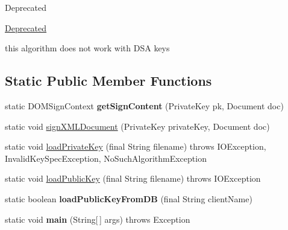 \begin{DoxyRefDesc}{Deprecated}
\item[\hyperlink{deprecated__deprecated000013}{Deprecated}]
\begin{DoxyItemize}
\item this algorithm does not work with D\-S\-A keys 
\end{DoxyItemize}\end{DoxyRefDesc}
\subsection*{Static Public Member Functions}
\begin{DoxyCompactItemize}
\item 
\hypertarget{classgov_1_1fnal_1_1ppd_1_1ZZattic_1_1GenEnveloped_a69be7eea0c284cf04dc66e76138895a8}{static D\-O\-M\-Sign\-Context {\bfseries get\-Sign\-Content} (Private\-Key pk, Document doc)}\label{classgov_1_1fnal_1_1ppd_1_1ZZattic_1_1GenEnveloped_a69be7eea0c284cf04dc66e76138895a8}

\item 
static void \hyperlink{classgov_1_1fnal_1_1ppd_1_1ZZattic_1_1GenEnveloped_aa8e572349a537781033c6e6313e49dbb}{sign\-X\-M\-L\-Document} (Private\-Key private\-Key, Document doc)
\item 
static void \hyperlink{classgov_1_1fnal_1_1ppd_1_1ZZattic_1_1GenEnveloped_a80d09b491d9a3a3c64651101e5510065}{load\-Private\-Key} (final String filename)  throws I\-O\-Exception, Invalid\-Key\-Spec\-Exception, No\-Such\-Algorithm\-Exception 
\item 
static void \hyperlink{classgov_1_1fnal_1_1ppd_1_1ZZattic_1_1GenEnveloped_abf95b0c7110d6a16d5329e91606475de}{load\-Public\-Key} (final String filename)  throws I\-O\-Exception 
\item 
\hypertarget{classgov_1_1fnal_1_1ppd_1_1ZZattic_1_1GenEnveloped_a303d48c06a4ed04baa8d16799f4fc8a0}{static boolean {\bfseries load\-Public\-Key\-From\-D\-B} (final String client\-Name)}\label{classgov_1_1fnal_1_1ppd_1_1ZZattic_1_1GenEnveloped_a303d48c06a4ed04baa8d16799f4fc8a0}

\item 
\hypertarget{classgov_1_1fnal_1_1ppd_1_1ZZattic_1_1GenEnveloped_a46554c2e6c56eb3fa74c7a794ced385e}{static void {\bfseries main} (String\mbox{[}$\,$\mbox{]} args)  throws Exception }\label{classgov_1_1fnal_1_1ppd_1_1ZZattic_1_1GenEnveloped_a46554c2e6c56eb3fa74c7a794ced385e}

\end{DoxyCompactItemize}


